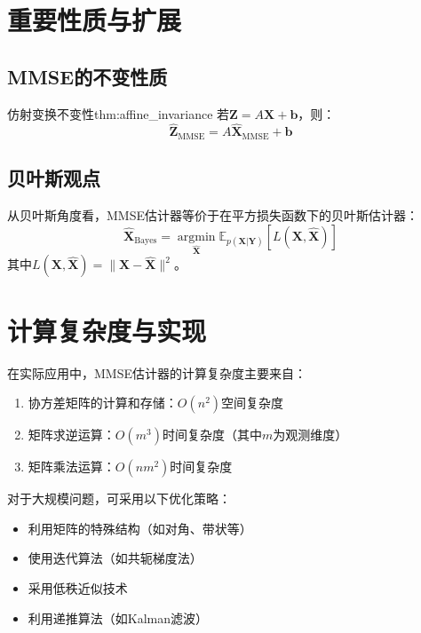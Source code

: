 \documentclass[11pt]{article}
\renewcommand{\vec}[1]{\bm{#1}}
\newcommand{\E}{\mathbb{E}}
\newcommand{\argmin}{\operatorname*{argmin}}
\begin{document}
\section{重要性质与扩展}

\subsection{MMSE的不变性质}

\begin{theorem}{仿射变换不变性}{thm:affine_invariance}
若$\vec{Z} = A\vec{X} + \vec{b}$，则：
\begin{equation}
\hat{\vec{Z}}_{\text{MMSE}} = A\hat{\vec{X}}_{\text{MMSE}} + \vec{b}
\end{equation}
\end{theorem}

\subsection{贝叶斯观点}

从贝叶斯角度看，MMSE估计器等价于在平方损失函数下的贝叶斯估计器：
\begin{equation}
\hat{\vec{X}}_{\text{Bayes}} = \argmin_{\hat{\vec{X}}} \E_{p(\vec{X}|\vec{Y})}[L(\vec{X}, \hat{\vec{X}})]
\end{equation}
其中$L(\vec{X}, \hat{\vec{X}}) = \|\vec{X} - \hat{\vec{X}}\|^2$。

\section{计算复杂度与实现}

在实际应用中，MMSE估计器的计算复杂度主要来自：
\begin{enumerate}[itemsep=0pt]
\item 协方差矩阵的计算和存储：$O(n^2)$空间复杂度
\item 矩阵求逆运算：$O(m^3)$时间复杂度（其中$m$为观测维度）
\item 矩阵乘法运算：$O(nm^2)$时间复杂度
\end{enumerate}

对于大规模问题，可采用以下优化策略：
\begin{itemize}[itemsep=0pt]
\item 利用矩阵的特殊结构（如对角、带状等）
\item 使用迭代算法（如共轭梯度法）
\item 采用低秩近似技术
\item 利用递推算法（如Kalman滤波）
\end{itemize}
\end{document}
